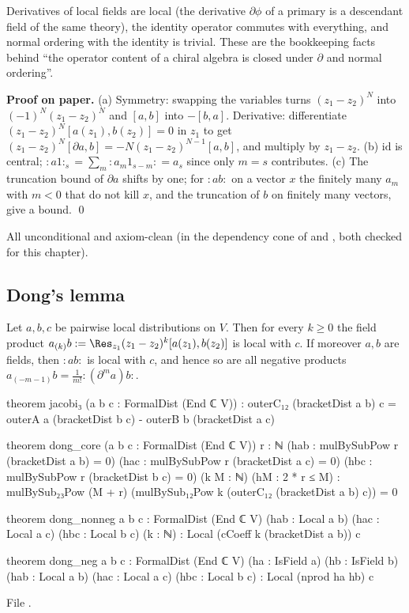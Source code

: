 \begin{physics}
Derivatives of local fields are local (the derivative $\partial\phi$ of a primary is a descendant
field of the same theory), the identity operator commutes with everything, and normal ordering with
the identity is trivial. These are the bookkeeping facts behind ``the operator content of a chiral
algebra is closed under $\partial$ and normal ordering''.
\end{physics}

\textbf{Proof on paper.} (a) Symmetry: swapping the variables turns $(z_1-z_2)^N$ into
$(-1)^N(z_1-z_2)^N$ and $[a,b]$ into $-[b,a]$. Derivative: differentiate $(z_1-z_2)^N[a(z_1),b(z_2)] = 0$
in $z_1$ to get $(z_1-z_2)^N[\partial a,b] = -N(z_1-z_2)^{N-1}[a,b]$, and multiply by $z_1-z_2$.
(b) $\mathrm{id}$ is central; ${:}a1{:}_s = \sum_m{:}a_m1_{s-m}{:} = a_s$ since only $m = s$
contributes. (c) The truncation bound of $\partial a$ shifts by one; for ${:}ab{:}$ on a vector $x$ the
finitely many $a_m$ with $m<0$ that do not kill $x$, and the truncation of $b$ on finitely many vectors,
give a bound. \qed

\begin{status}
All unconditional and axiom-clean (in the dependency cone of  and
, both checked for this chapter).
\end{status}

\subsection{Dong's lemma}

\begin{theorem}\label{l03:thm:dong}
Let $a,b,c$ be pairwise local distributions on $V$. Then for every $k\ge0$ the field product
$a_{(k)}b := \Res_{z_1}(z_1-z_2)^k[a(z_1),b(z_2)]$ is local with $c$. If moreover $a,b$ are fields,
then ${:}ab{:}$ is local with $c$, and hence so are all negative products
$a_{(-m-1)}b = \frac1{m!}{:}(\partial^ma)b{:}$.
\end{theorem}
\begin{leancode}
theorem jacobi₃ (a b c : FormalDist (End ℂ V)) :
    outerC₁₂ (bracketDist a b) c
      = outerA a (bracketDist b c) - outerB b (bracketDist a c)

theorem dong_core (a b c : FormalDist (End ℂ V)) {r : ℕ}
    (hab : mulBySubPow r (bracketDist a b) = 0)
    (hac : mulBySubPow r (bracketDist a c) = 0)
    (hbc : mulBySubPow r (bracketDist b c) = 0)
    (k M : ℕ) (hM : 2 * r ≤ M) :
    mulBySub₂₃Pow (M + r) (mulBySub₁₂Pow k (outerC₁₂ (bracketDist a b) c)) = 0

theorem dong_nonneg {a b c : FormalDist (End ℂ V)}
    (hab : Local a b) (hac : Local a c) (hbc : Local b c) (k : ℕ) :
    Local (cCoeff k (bracketDist a b)) c

theorem dong_neg {a b c : FormalDist (End ℂ V)} (ha : IsField a) (hb : IsField b)
    (hab : Local a b) (hac : Local a c) (hbc : Local b c) :
    Local (nprod ha hb) c
\end{leancode}
File .


